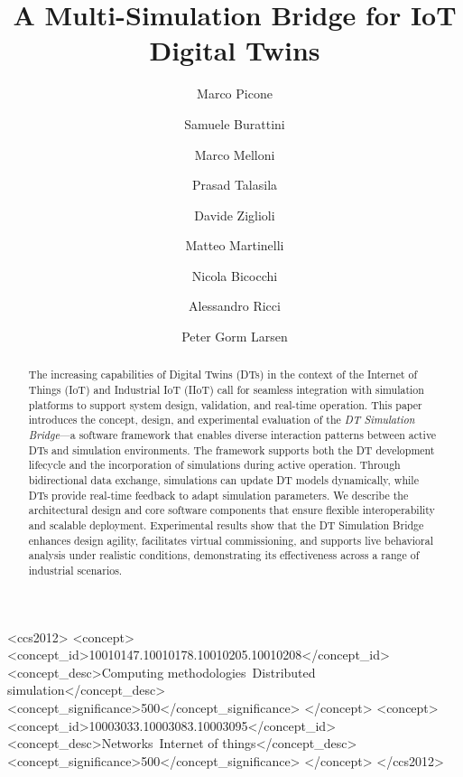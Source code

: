 \documentclass[sigconf]{acmart}
\begin{document}
\title{A Multi-Simulation Bridge for IoT Digital Twins}

\author{Marco Picone}
\author{Samuele Burattini}
\author{Marco Melloni}
\author{Prasad Talasila}
\author{Davide Ziglioli}
\author{Matteo Martinelli}
\author{Nicola Bicocchi}
\author{Alessandro Ricci}
\author{Peter Gorm Larsen}
\renewcommand{\shortauthors}{Picone et al.}

\begin{abstract}
The increasing capabilities of Digital Twins (DTs) in the context of the Internet of Things (IoT) and Industrial IoT (IIoT) call for seamless integration with simulation platforms to support system design, validation, and real-time operation. This paper introduces the concept, design, and experimental evaluation of the \emph{DT Simulation Bridge}---a software framework that enables diverse interaction patterns between active DTs and simulation environments.
The framework supports both the DT development lifecycle and the incorporation of simulations during active operation. Through bidirectional data exchange, simulations can update DT models dynamically, while DTs provide real-time feedback to adapt simulation parameters. We describe the architectural design and core software components that ensure flexible interoperability and scalable deployment.
Experimental results show that the DT Simulation Bridge enhances design agility, facilitates virtual commissioning, and supports live behavioral analysis under realistic conditions, demonstrating its effectiveness across a range of industrial scenarios.
\end{abstract}


\begin{CCSXML}
<ccs2012>
   <concept>
       <concept_id>10010147.10010178.10010205.10010208</concept_id>
       <concept_desc>Computing methodologies~Distributed simulation</concept_desc>
       <concept_significance>500</concept_significance>
   </concept>
   <concept>
       <concept_id>10003033.10003083.10003095</concept_id>
       <concept_desc>Networks~Internet of things</concept_desc>
       <concept_significance>500</concept_significance>
   </concept>
</ccs2012>
\end{CCSXML}
\end{document}
